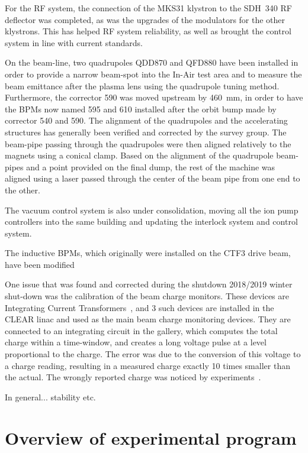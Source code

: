 \documentclass[a4paper,
               keeplastbox,   %
               ]{jacow}
\begin{document}
For the RF system, the connection of the MKS31 klystron to the SDH~340 RF deflector was completed, as was the upgrades of the modulators for the other klystrons.
This has helped RF system reliability, as well as brought the control system in line with current standards.


On the beam-line, two quadrupoles QDD870 and QFD880 have been installed in order to provide a narrow beam-spot into the In-Air test area and to measure the beam emittance after the plasma lens using the quadrupole tuning method.
Furthermore, the corrector 590 was moved upstream by 460~mm, in order to have the BPMs now named 595 and 610 installed after the orbit bump made by corrector 540 and 590.
The alignment of the quadrupoles and the accelerating structures has generally been verified and corrected by the survey group.
The beam-pipe passing through the quadrupoles were then aligned relatively to the magnets using a conical clamp.
Based on the alignment of the quadrupole beam-pipes and a point provided on the final dump, the rest of the machine was aligned using a laser passed through the center of the beam pipe from one end to the other.

The vacuum control system is also under consolidation, moving all the ion pump controllers into the same building and updating the interlock system and control system.

The inductive BPMs, which originally were installed on the CTF3 drive beam, have been modified 

One issue that was found and corrected during the shutdown 2018/2019 winter shut-down was the calibration of the beam charge monitors.
These devices are Integrating Current Transformers~\cite{BergozICT}, and 3 such devices are installed in the CLEAR linac and used as the main beam charge monitoring devices.
They are connected to an integrating circuit in the gallery, which computes the total charge within a time-window, and creates a long voltage pulse at a level proportional to the charge.
The error was due to the conversion of this voltage to a charge reading, resulting in a measured charge exactly 10 times smaller than the actual.
The wrongly reported charge was noticed by experiments~\cite{MarisTali:E-SEU,Antonio::IEEE-Kicks}.

In general... stability etc.

\section{Overview of experimental program}
\end{document}
